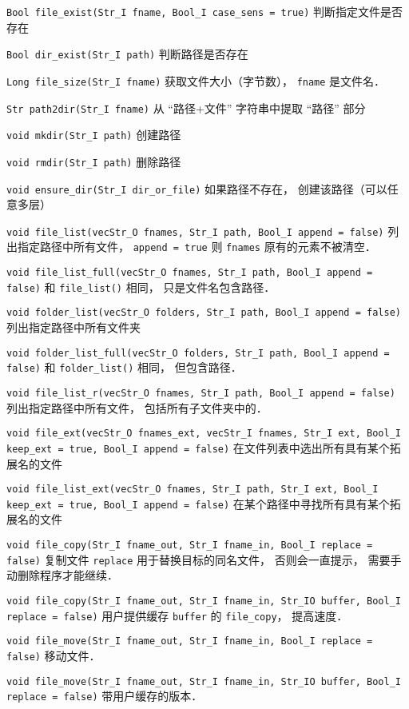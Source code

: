 
\verb|Bool file_exist(Str_I fname, Bool_I case_sens = true)| 判断指定文件是否存在

\verb|Bool dir_exist(Str_I path)| 判断路径是否存在

\verb|Long file_size(Str_I fname)| 获取文件大小（字节数）， \verb|fname| 是文件名．

\verb|Str path2dir(Str_I fname)| 从 “路径+文件” 字符串中提取 “路径” 部分

\verb|void mkdir(Str_I path)| 创建路径

\verb|void rmdir(Str_I path)| 删除路径

\verb|void ensure_dir(Str_I dir_or_file)| 如果路径不存在， 创建该路径（可以任意多层）

\verb|void file_list(vecStr_O fnames, Str_I path, Bool_I append = false)| 列出指定路径中所有文件， \verb|append = true| 则 \verb|fnames| 原有的元素不被清空．

\verb|void file_list_full(vecStr_O fnames, Str_I path, Bool_I append = false)| 和 \verb|file_list()| 相同， 只是文件名包含路径．

\verb|void folder_list(vecStr_O folders, Str_I path, Bool_I append = false)| 列出指定路径中所有文件夹

\verb|void folder_list_full(vecStr_O folders, Str_I path, Bool_I append = false)| 和 \verb|folder_list()| 相同， 但包含路径．

\verb|void file_list_r(vecStr_O fnames, Str_I path, Bool_I append = false)| 列出指定路径中所有文件， 包括所有子文件夹中的．

\verb|void file_ext(vecStr_O fnames_ext, vecStr_I fnames, Str_I ext, Bool_I keep_ext = true, Bool_I append = false)| 在文件列表中选出所有具有某个拓展名的文件

\verb|void file_list_ext(vecStr_O fnames, Str_I path, Str_I ext, Bool_I keep_ext = true, Bool_I append = false)| 在某个路径中寻找所有具有某个拓展名的文件

\verb|void file_copy(Str_I fname_out, Str_I fname_in, Bool_I replace = false)| 复制文件 \verb|replace| 用于替换目标的同名文件， 否则会一直提示， 需要手动删除程序才能继续．

\verb|void file_copy(Str_I fname_out, Str_I fname_in, Str_IO buffer, Bool_I replace = false)| 用户提供缓存 \verb|buffer| 的 \verb|file_copy|， 提高速度．

\verb|void file_move(Str_I fname_out, Str_I fname_in, Bool_I replace = false)| 移动文件．

\verb|void file_move(Str_I fname_out, Str_I fname_in, Str_IO buffer, Bool_I replace = false)| 带用户缓存的版本．

